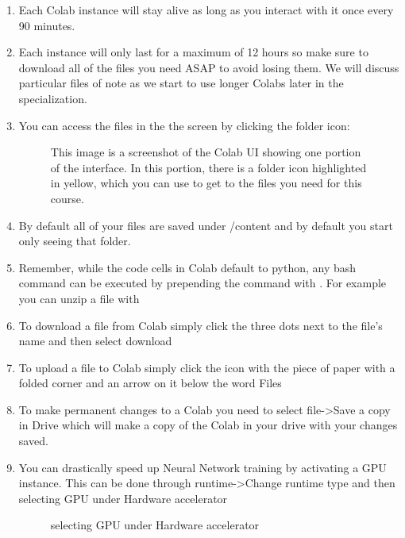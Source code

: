 \begin{enumerate}
  \item Each Colab instance will stay alive as long as you interact with it once every 90 minutes.
  \item Each instance will only last for a maximum of 12 hours so make sure to download all of the files you need ASAP to avoid losing them. We will discuss particular files of note as we start to use longer Colabs later in the specialization.
  \item You can access the files in the the screen by clicking the folder icon: 

\begin{figure}
    \caption{This image is a screenshot of the Colab UI showing one portion of the interface.  In this portion, there is a folder icon highlighted in yellow, which you can use to get to the files you need for this course.}
\end{figure}  




  \item By default all of your files are saved under /content and by default you start only seeing that folder. 
  \item Remember, while the code cells in Colab default to python, any bash command can be executed by prepending the command with \PYTHON{!}. For example you can unzip a file with 
  \item To download a file from Colab simply click the three dots next to the file's name and then select download
  \item To upload a file to Colab simply click the icon with the piece of paper with a folded corner and an arrow on it below the word Files
  \item To make permanent changes to a Colab you need to select file->Save a copy in Drive which will make a copy of the Colab in your drive with your changes saved.
  \item You can drastically speed up Neural Network training by activating a GPU instance. This can be done through runtime->Change runtime type and then selecting GPU under Hardware accelerator
  
\begin{figure}
    \caption{selecting GPU under Hardware accelerator}
\end{figure}  
  
\end{enumerate}



